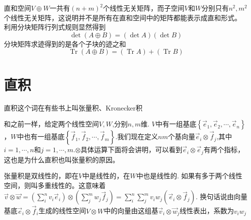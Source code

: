 \documentclass[a4paper,11pt]{article}
\begin{document}
    直和空间$V\oplus W$一共有$(n+m)^2$个线性无关矩阵，而子空间$V$和$W$分别只有$n^2,m^2$个线性无关矩阵，这说明并不是所有在直和空间中的矩阵都能表示成直和形式。\\
    利用分块矩阵行列式规则显然得到
    \begin{equation}
        \operatorname{det}(A \oplus B)=(\operatorname{det} A)(\operatorname{det} B)
    \end{equation}
    分块矩阵求迹得到的是各个子块的迹之和
    \begin{equation}
        \operatorname{Tr}(A \oplus B)=(\operatorname{Tr} A)+(\operatorname{Tr} B)
    \end{equation}
    \section{直积}
    直积这个词在有些书上叫张量积、Kronecker积

    和之前一样，给定两个线性空间$V,W$,分别$n,m$维. $V$中有一组基底$\left\{\vec{e}_{1}, \vec{e}_{2}, \cdots, \vec{e}_{n}\right\}$，$W$中也有一组基底$\left\{\vec{f}_{1}, \vec{f}_{2}, \cdots, \vec{f}_{m}\right\}$.我们现在定义$nm$个基向量$\vec{e}_{i} \otimes \vec{f}_{j}$,其中$i=1,\cdots,n$和$j=1,\cdots,m$.$\otimes$具体运算下面将会讲明，可以看到$\vec{e}_i\otimes\vec{e}_j$有两个指标，这也是为什么直积也叫张量积的原因。

    张量积是双线性的，即在$V$中是线性的，在$W$中也是线性的. 如果有多于两个线性空间，则叫多重线性的。这意味着$\vec{v} \otimes \vec{w}=\left(\sum_{i}^{n} v_{i} \vec{e}_{i}\right) \otimes\left(\sum_{j}^{m} w_{j} \vec{f}_{j}\right)=\sum_{i}^{n} \sum_{j}^{m} v_{i} w_{j}\left(\vec{e}_{i} \otimes \vec{f}_{j}\right)$. 换句话说由向量基底$\vec{e}_i\otimes\vec{f}_i$生成的线性空间$V\otimes W$中的向量由这组基$\vec{v}_i\otimes\vec{w}_j$线性表出，系数为$v_iw_j$
\end{document}
